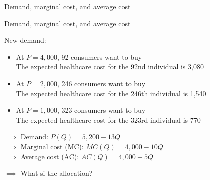 \begin{frame}{Demand, marginal cost, and average cost}

\begin{center}
\end{center}
\end{frame}
\begin{frame}{Demand, marginal cost, and average cost}

    New demand:
    \begin{itemize}
        \item At $P=4,000$, 92 consumers want to buy\\
        {\color{blue} The expected healthcare cost for the 92nd individual is 3,080}
        \item At $P=2,000$, 246 consumers want to buy\\
        {\color{blue} The expected healthcare cost for the 246th individual is 1,540}
        \item At $P=1,000$, 323 consumers want to buy\\
        {\color{blue} The expected healthcare cost for the 323rd individual is 770}
    \end{itemize}
    $\implies$ Demand: $P(Q) = 5,200 - 13Q$\\
    $\implies$ Marginal cost (MC): $MC(Q) = 4,000 - 10Q$\\
    $\implies$ Average cost (AC): $AC(Q) = 4,000 - 5 Q$\\
    \vspace{3mm}

    $\implies$ What si the  allocation?

\end{frame}
